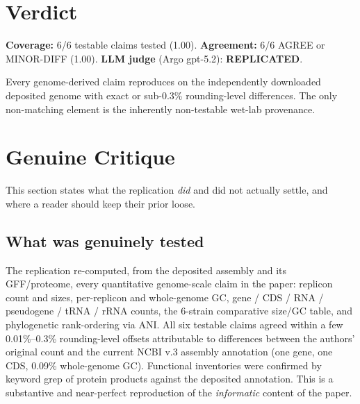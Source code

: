 \documentclass[11pt]{article}
\begin{document}
\section{Verdict}

\textbf{Coverage:} 6/6 testable claims tested (1.00). \quad
\textbf{Agreement:} 6/6 AGREE or MINOR-DIFF (1.00). \quad
\textbf{LLM judge} (Argo gpt-5.2): \textcolor{green!50!black}{\textbf{REPLICATED}}.

Every genome-derived claim reproduces on the independently downloaded deposited genome with exact or sub-0.3\% rounding-level differences. The only non-matching element is the inherently non-testable wet-lab provenance.

\begin{center}
\end{center}

\section{Genuine Critique}

This section states what the replication \emph{did} and did not actually settle, and where a reader should keep their prior loose.

\subsection*{What was genuinely tested}
The replication re-computed, from the deposited assembly and its GFF/proteome, every quantitative genome-scale claim in the paper: replicon count and sizes, per-replicon and whole-genome GC, gene / CDS / RNA / pseudogene / tRNA / rRNA counts, the 6-strain comparative size/GC table, and phylogenetic rank-ordering via ANI. All six testable claims agreed within a few 0.01\%--0.3\% rounding-level offsets attributable to differences between the authors' original count and the current NCBI v.3 assembly annotation (one gene, one CDS, 0.09\% whole-genome GC). Functional inventories were confirmed by keyword grep of protein products against the deposited annotation. This is a substantive and near-perfect reproduction of the \emph{informatic} content of the paper.
\end{document}

